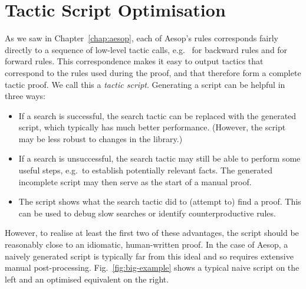 \newcommand{\pre}{\Fn{pre}}
\newcommand{\post}{\Fn{post}}
\newcommand{\step}[5]{\ensuremath{(#1,\allowbreak #2,\allowbreak #3,\allowbreak #4,\allowbreak #5)}}
\newcommand{\aeq}{\mathrel{\hat{≡}}}

\chapter{Tactic Script Optimisation}%
\label{chap:script}

As we saw in Chapter~\ref{chap:aesop}, each of Aesop's rules corresponds fairly directly to a sequence of low-level tactic calls, e.g.\  for backward rules and  for forward rules.
This correspondence makes it easy to output tactics that correspond to the rules used during the proof, and that therefore form a complete tactic proof.
We call this a \emph{tactic script}.
Generating a script can be helpful in three ways:
\begin{itemize}
  \item If a search is successful, the search tactic can be replaced with the generated script, which typically has much better performance.
        (However, the script may be less robust to changes in the library.)
  \item If a search is unsuccessful, the search tactic may still be able to perform some useful steps, e.g.\ to establish potentially relevant facts.
        The generated incomplete script may then serve as the start of a manual proof.
  \item The script shows what the search tactic did to (attempt to) find a proof.
        This can be used to debug slow searches or identify counterproductive rules.
\end{itemize}

However, to realise at least the first two of these advantages, the script should be reasonably close to an idiomatic, human-written proof.
In the case of Aesop, a naively generated script is typically far from this ideal and so requires extensive manual post-processing.
Fig.~\ref{fig:big-example} shows a typical naive script on the left and an optimised equivalent on the right.

